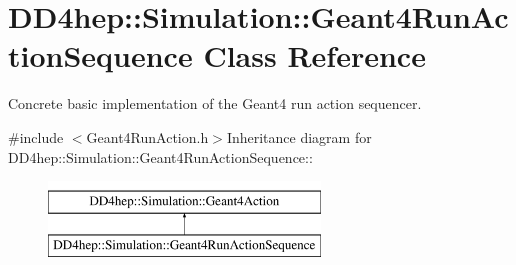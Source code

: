 \hypertarget{class_d_d4hep_1_1_simulation_1_1_geant4_run_action_sequence}{
\section{DD4hep::Simulation::Geant4RunActionSequence Class Reference}
\label{class_d_d4hep_1_1_simulation_1_1_geant4_run_action_sequence}
}


Concrete basic implementation of the Geant4 run action sequencer.  


{\ttfamily \#include $<$Geant4RunAction.h$>$}Inheritance diagram for DD4hep::Simulation::Geant4RunActionSequence::\begin{figure}[H]
\begin{center}
\leavevmode
\includegraphics[height=2cm]{class_d_d4hep_1_1_simulation_1_1_geant4_run_action_sequence}
\end{center}
\end{figure}
